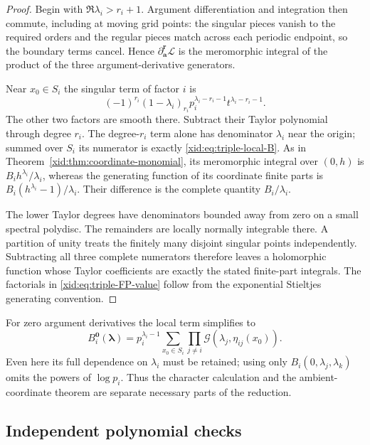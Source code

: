 \begin{proof}
Begin with $\Re\lambda_i>r_i+1$. Argument differentiation and
integration then commute, including at moving grid points: the singular
pieces vanish to the required orders and the regular pieces match across
each periodic endpoint, so the boundary terms cancel. Hence
$\partial_{\boldsymbol a}^{\boldsymbol r}\mathcal L$ is the
meromorphic integral of the product of the three argument-derivative
generators.

Near $x_0\in S_i$ the singular term of factor $i$ is
\[
 (-1)^{r_i}(1-\lambda_i)_{r_i}
 p_i^{\lambda_i-r_i-1}t^{\lambda_i-r_i-1}.
\]
The other two factors are smooth there.  Subtract their Taylor
polynomial through degree $r_i$.  The degree-$r_i$ term alone has
denominator $\lambda_i$ near the origin; summed over $S_i$ its
numerator is exactly \eqref{xid:eq:triple-local-B}.
As in Theorem~\ref{xid:thm:coordinate-monomial}, its meromorphic integral
over $(0,h)$ is $B_i h^{\lambda_i}/\lambda_i$, whereas the generating
function of its coordinate finite parts is
$B_i(h^{\lambda_i}-1)/\lambda_i$.  Their difference is the complete
quantity $B_i/\lambda_i$.

The lower Taylor degrees have denominators bounded away from zero
on a small spectral polydisc.  The remainders are locally normally
integrable there.  A partition of unity treats the finitely many
disjoint singular points independently.  Subtracting all three
complete numerators therefore leaves a holomorphic function whose
Taylor coefficients are exactly the stated finite-part integrals.
The factorials in \eqref{xid:eq:triple-FP-value} follow from the exponential
Stieltjes generating convention.
\end{proof}

For zero argument derivatives the local term simplifies to
\[
 B_i^{\boldsymbol0}(\boldsymbol\lambda)
 =p_i^{\lambda_i-1}\sum_{x_0\in S_i}
             \prod_{j\ne i}\mathscr G(\lambda_j,\eta_{ij}(x_0)).
\]
Even here its full dependence on $\lambda_i$ must be retained; using
only $B_i(0,\lambda_j,\lambda_k)$ omits the powers of $\log p_i$.
Thus the character calculation and the ambient-coordinate theorem are
separate necessary parts of the reduction.

\subsection{Independent polynomial checks}

